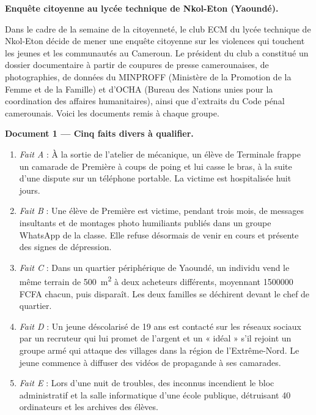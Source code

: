 \documentclass[11pt]{article}
\newcommand{\cle}[1]{{\popxbold\color{popdark}#1}}
\newcounter{popsec}
\newcounter{popsub}
\newcommand{\courssub}[1]{%
  \stepcounter{popsub}%
  \par\vspace{9pt}\noindent{\popxbold\fontsize{11.5}{13}\selectfont\color{popink}{\color{poporange}\thepopsec.\thepopsub}\hspace{6pt}#1}\par\nopagebreak\vspace{4pt}
}
\begin{document}
\courssub{Situation}

\textbf{Enquête citoyenne au lycée technique de Nkol-Eton (Yaoundé).}\par

Dans le cadre de la semaine de la citoyenneté, le club ECM du lycée technique de Nkol-Eton décide de mener une \cle{enquête citoyenne} sur les violences qui touchent les jeunes et les communautés au Cameroun. Le président du club a constitué un \cle{dossier documentaire} à partir de coupures de presse camerounaises, de photographies, de données du MINPROFF (Ministère de la Promotion de la Femme et de la Famille) et d'OCHA (Bureau des Nations unies pour la coordination des affaires humanitaires), ainsi que d'extraits du Code pénal camerounais. Voici les documents remis à chaque groupe.

\textbf{Document 1 — Cinq faits divers à qualifier.}\par

\begin{enumerate}
\item \emph{Fait A} : À la sortie de l'atelier de mécanique, un élève de Terminale frappe un camarade de Première à coups de poing et lui casse le bras, à la suite d'une dispute sur un téléphone portable. La victime est hospitalisée huit jours.
\item \emph{Fait B} : Une élève de Première est victime, pendant trois mois, de messages insultants et de montages photo humiliants publiés dans un groupe WhatsApp de la classe. Elle refuse désormais de venir en cours et présente des signes de dépression.
\item \emph{Fait C} : Dans un quartier périphérique de Yaoundé, un individu vend le même terrain de \SI{500}{m^2} à deux acheteurs différents, moyennant \num{1500000} FCFA chacun, puis disparaît. Les deux familles se déchirent devant le chef de quartier.
\item \emph{Fait D} : Un jeune déscolarisé de 19 ans est contacté sur les réseaux sociaux par un recruteur qui lui promet de l'argent et un « idéal » s'il rejoint un groupe armé qui attaque des villages dans la région de l'Extrême-Nord. Le jeune commence à diffuser des vidéos de propagande à ses camarades.
\item \emph{Fait E} : Lors d'une nuit de troubles, des inconnus incendient le bloc administratif et la salle informatique d'une école publique, détruisant 40 ordinateurs et les archives des élèves.
\end{enumerate}
\end{document}
